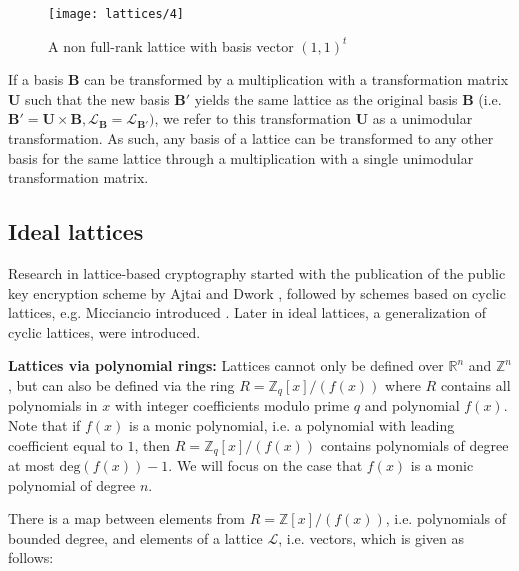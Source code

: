 \begin{enumerate}
\begin{figure}[H]
\texttt{[image: lattices/4]}
\centering
\caption{A non full-rank lattice with basis vector $(1, 1)^t$}
\end{figure}


\end{enumerate}










If a basis $\textbf{B}$ can be transformed by a multiplication with a transformation matrix $\textbf{U}$ such that the new basis $\textbf{B}'$ yields the same lattice as the original basis $\textbf{B}$ (i.e. $\textbf{B}' = \textbf{U} \times \textbf{B}, \mathcal{L}_\textbf{B} = \mathcal{L}_{\textbf{B}'})$, we refer to this transformation $\textbf{U}$ as a unimodular transformation. As such, any basis of a lattice can be transformed to any other basis for the same lattice through a multiplication with a single unimodular transformation matrix.


\subsection{Ideal lattices}
Research in lattice-based cryptography started with the publication of the public key encryption scheme by Ajtai and Dwork \cite{Ajtai:1997:PCW:258533.258604}, followed by schemes based on cyclic lattices, e.g. Micciancio introduced \cite{Mic07cyclic}. Later in \cite{Mic07cyclic} ideal lattices, a generalization of cyclic lattices, were introduced.

\textbf{Lattices via polynomial rings: }
Lattices cannot only be defined over $\mathbb{R}^n$ and $\mathbb{Z}^n$, but can also be defined via the ring $R = \mathbb{Z}_{q}[x]/ ( f(x) )$ where $R$ contains all polynomials in $x$ with integer coefficients modulo prime $q$ and polynomial $f(x)$. Note that if $f(x)$ is a monic polynomial, i.e. a polynomial with leading coefficient equal to $1$, then $R = \mathbb{Z}_{q}[x]/ ( f(x) )$ contains polynomials of degree at most $\text{deg}(f(x)) - 1$. We will focus on the case that $f(x)$ is a monic polynomial of degree $n$.

There is a map between elements from $R = \mathbb{Z}[x]/ ( f(x) )$, i.e. polynomials of bounded degree, and elements of a lattice $\mathcal{L}$, i.e. vectors, which is given as follows:

